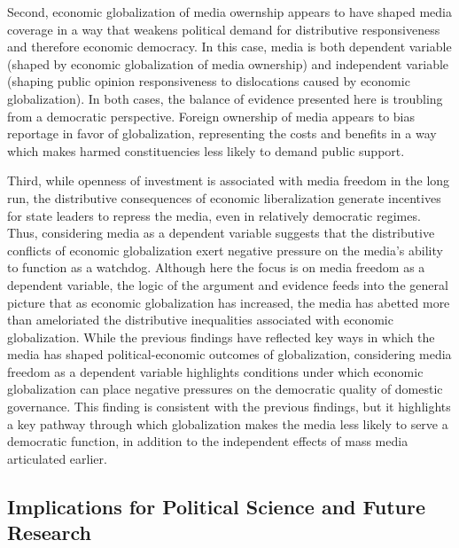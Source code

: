 \documentclass[12pt]{report}
\begin{document}
Second, economic globalization of media owernship appears to have shaped media coverage in a way that weakens political demand for distributive responsiveness and therefore economic democracy. In this case, media is both dependent variable (shaped by economic globalization of media ownership) and independent variable (shaping public opinion responsiveness to dislocations caused by economic globalization). In both cases, the balance of evidence presented here is troubling from a democratic perspective. Foreign ownership of media appears to bias reportage in favor of globalization, representing the costs and benefits in a way which makes harmed constituencies less likely to demand public support.

Third, while openness of investment is associated with media freedom in the long run, the distributive consequences of economic liberalization generate incentives for state leaders to repress the media, even in relatively democratic regimes. Thus, considering media as a dependent variable suggests that the distributive conflicts of economic globalization exert negative pressure on the media's ability to function as a watchdog. Although here the focus is on media freedom as a dependent variable, the logic of the argument and evidence feeds into the general picture that as economic globalization has increased, the media has abetted more than ameloriated the distributive inequalities associated with economic globalization. While the previous findings have reflected key ways in which the media has shaped political-economic outcomes of globalization, considering media freedom as a dependent variable highlights conditions under which economic globalization can place negative pressures on the democratic quality of domestic governance. This finding is consistent with the previous findings, but it highlights a key pathway through which globalization makes the media less likely to serve a democratic function, in addition to the independent effects of mass media articulated earlier.

\subsection{Implications for Political Science and Future Research}
\end{document}

